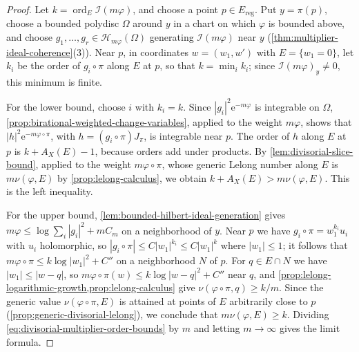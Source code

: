 \begin{proof}
Let $k=\operatorname{ord}_E\mathcal I(m\varphi)$, and choose a point $p\in E_{\mathrm{reg}}$. Put $y=\pi(p)$, choose a bounded polydisc $\Omega$ around $y$ in a chart on which $\varphi$ is bounded above, and choose $g_1,\ldots,g_r\in\mathcal H_{m\varphi}(\Omega)$ generating $\mathcal I(m\varphi)$ near $y$ (\cref{thm:multiplier-ideal-coherence}(3)). Near $p$, in coordinates $w=(w_1,w')$ with $E=\{w_1=0\}$, let $k_i$ be the order of $g_i\circ\pi$ along $E$ at $p$, so that $k=\min_ik_i$; since $\mathcal I(m\varphi)_y\neq0$, this minimum is finite.

For the lower bound, choose $i$ with $k_i=k$. Since $|g_i|^2\mathrm e^{-m\varphi}$ is integrable on $\Omega$, \cref{prop:birational-weighted-change-variables}, applied to the weight $m\varphi$, shows that $|h|^2\mathrm e^{-m\varphi\circ\pi}$, with $h=(g_i\circ\pi)J_\pi$, is integrable near $p$. The order of $h$ along $E$ at $p$ is $k+A_X(E)-1$, because orders add under products. By \cref{lem:divisorial-slice-bound}, applied to the weight $m\varphi\circ\pi$, whose generic Lelong number along $E$ is $m\nu(\varphi,E)$ by \cref{prop:lelong-calculus}, we obtain $k+A_X(E)>m\nu(\varphi,E)$. This is the left inequality.

For the upper bound, \cref{lem:bounded-hilbert-ideal-generation} gives $m\varphi\leq\log\sum_i|g_i|^2+mC_m$ on a neighborhood of $y$. Near $p$ we have $g_i\circ\pi=w_1^{k_i}u_i$ with $u_i$ holomorphic, so $|g_i\circ\pi|\leq C|w_1|^{k_i}\leq C|w_1|^k$ where $|w_1|\leq1$; it follows that $m\varphi\circ\pi\leq k\log|w_1|^2+C''$ on a neighborhood $N$ of $p$. For $q\in E\cap N$ we have $|w_1|\leq|w-q|$, so $m\varphi\circ\pi(w)\leq k\log|w-q|^2+C''$ near $q$, and \cref{prop:lelong-logarithmic-growth,prop:lelong-calculus} give $\nu(\varphi\circ\pi,q)\geq k/m$. Since the generic value $\nu(\varphi\circ\pi,E)$ is attained at points of $E$ arbitrarily close to $p$ (\cref{prop:generic-divisorial-lelong}), we conclude that $m\nu(\varphi,E)\geq k$. Dividing \eqref{eq:divisorial-multiplier-order-bounds} by $m$ and letting $m\to\infty$ gives the limit formula.
\end{proof}

